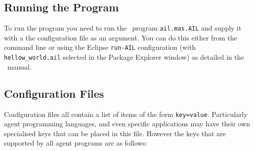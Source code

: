 \documentclass[a4]{article}
\begin{document}
\subsection{Running the Program}

To run the program you need to run the \java\ program \texttt{ail.mas.AIL} and supply it with a the configuration file as an argument.  You can do this either from the command line or using the Eclipse \texttt{run-AIL} configuration (with \texttt{hellow\_world.ail} selected in the Package Explorer window) as detailed in the \mcapl\ manual.

\subsection{Configuration Files}

Configuration files all contain a list of items of the form \texttt{key=value}.  Particularly agent programming languages, and even specific applications may have their own specialised keys that can be placed in this file.  However the keys that are supported by all agent programs are as follows:
\end{document}

